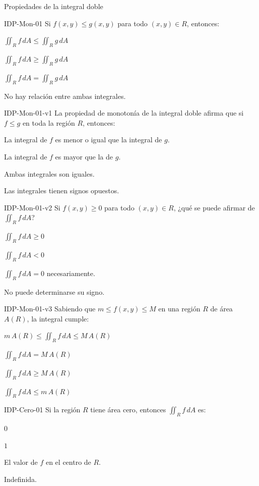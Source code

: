 \documentclass[a4,11pt]{aleph-notas}
\begin{document}
\begin{quiz}{Propiedades de la integral doble}
\begin{multi}[]%
    {IDP-Mon-01}
    Si $f(x,y)\leq g(x,y)$ para todo $(x,y)\in R$, entonces:
    \item* $\displaystyle\iint_R f\,dA \leq \iint_R g\,dA$
    \item $\displaystyle\iint_R f\,dA \geq \iint_R g\,dA$
    \item $\displaystyle\iint_R f\,dA = \iint_R g\,dA$
    \item No hay relación entre ambas integrales.
\end{multi}

\begin{multi}[]%
    {IDP-Mon-01-v1}
    La propiedad de monotonía de la integral doble afirma que si $f\leq g$ en toda la región $R$, entonces:
    \item* La integral de $f$ es menor o igual que la integral de $g$.
    \item La integral de $f$ es mayor que la de $g$.
    \item Ambas integrales son iguales.
    \item Las integrales tienen signos opuestos.
\end{multi}

\begin{multi}[]%
    {IDP-Mon-01-v2}
    Si $f(x,y)\geq 0$ para todo $(x,y)\in R$, ¿qué se puede afirmar de $\displaystyle\iint_R f\,dA$?
    \item* $\displaystyle\iint_R f\,dA \geq 0$
    \item \(\displaystyle\iint_R f\,dA < 0\)
    \item $\displaystyle\iint_R f\,dA = 0$ necesariamente.
    \item No puede determinarse su signo.
\end{multi}

\begin{multi}[]%
    {IDP-Mon-01-v3}
    Sabiendo que $m \leq f(x,y) \leq M$ en una región $R$ de área $A(R)$, la integral cumple:
    \item* $\displaystyle m\,A(R) \leq \iint_R f\,dA \leq M\,A(R)$
    \item $\displaystyle \iint_R f\,dA = M\,A(R)$
    \item $\displaystyle \iint_R f\,dA \geq M\,A(R)$
    \item $\displaystyle \iint_R f\,dA \leq m\,A(R)$
\end{multi}

\begin{multi}[]%
    {IDP-Cero-01}
    Si la región $R$ tiene área cero, entonces $\displaystyle\iint_R f\,dA$ es:
    \item* $0$
    \item $1$
    \item El valor de $f$ en el centro de $R$.
    \item Indefinida.
\end{multi}


\end{quiz}
\end{document}
